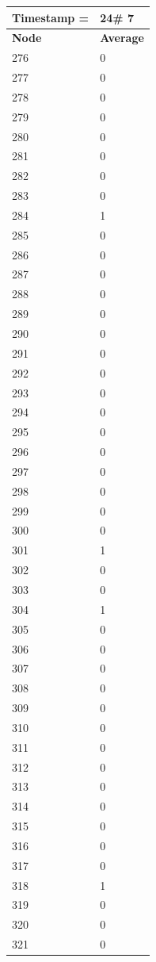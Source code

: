 \begin{tabular}{|l||l|}
\hline
\textbf{Timestamp =} & \textbf{24}\# 7\\\hline
	\textbf{Node} & \textbf{Average} \\ \hline
\hline
	276 & 0 \\ \hline
	277 & 0 \\ \hline
	278 & 0 \\ \hline
	279 & 0 \\ \hline
	280 & 0 \\ \hline
	281 & 0 \\ \hline
	282 & 0 \\ \hline
	283 & 0 \\ \hline
	284 & 1 \\ \hline
	285 & 0 \\ \hline
	286 & 0 \\ \hline
	287 & 0 \\ \hline
	288 & 0 \\ \hline
	289 & 0 \\ \hline
	290 & 0 \\ \hline
	291 & 0 \\ \hline
	292 & 0 \\ \hline
	293 & 0 \\ \hline
	294 & 0 \\ \hline
	295 & 0 \\ \hline
	296 & 0 \\ \hline
	297 & 0 \\ \hline
	298 & 0 \\ \hline
	299 & 0 \\ \hline
	300 & 0 \\ \hline
	301 & 1 \\ \hline
	302 & 0 \\ \hline
	303 & 0 \\ \hline
	304 & 1 \\ \hline
	305 & 0 \\ \hline
	306 & 0 \\ \hline
	307 & 0 \\ \hline
	308 & 0 \\ \hline
	309 & 0 \\ \hline
	310 & 0 \\ \hline
	311 & 0 \\ \hline
	312 & 0 \\ \hline
	313 & 0 \\ \hline
	314 & 0 \\ \hline
	315 & 0 \\ \hline
	316 & 0 \\ \hline
	317 & 0 \\ \hline
	318 & 1 \\ \hline
	319 & 0 \\ \hline
	320 & 0 \\ \hline
	321 & 0 \\ \hline
\end{tabular}
